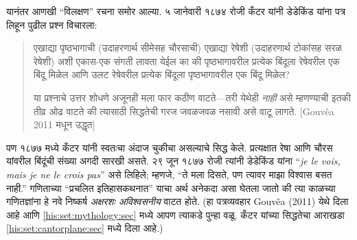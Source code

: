 यानंतर आणखी “विलक्षण” रचना समोर आल्या. ५ जानेवारी १८७४ रोजी कँटर यांनी डेडेकिंड यांना पत्र लिहून पुढील प्रश्न विचारला:
\begin{quote}
एखाद्या पृष्ठभागाची (उदाहरणार्थ सीमेसह चौरसाची) एखाद्या रेषेशी (उदाहरणार्थ टोकांसह सरळ रेषेशी) अशी एकास-एक संगती लावता येईल का की पृष्ठभागावरील प्रत्येक बिंदूला रेषेवरील एक बिंदू मिळेल आणि उलट रेषेवरील प्रत्येक बिंदूला पृष्ठभागावरील एक बिंदू मिळेल?

या प्रश्नाचे उत्तर शोधणे अजूनही मला फार कठीण वाटते—तरी येथेही \emph{नाही} असे म्हणण्याची इतकी तीव्र ओढ वाटते की त्यासाठी सिद्धतेची गरज जवळजवळ नसावी असे वाटू लागते.
[Gouv\^{e}a 2011 मधून उद्धृत]
\end{quote}
पण १८७७ मध्ये कँटर यांनी स्वतःचा अंदाज चुकीचा असल्याचे सिद्ध केले. प्रत्यक्षात रेषा आणि चौरस यांवरील बिंदूंची संख्या अगदी सारखी असते. २९ जून १८७७ रोजी त्यांनी डेडेकिंड यांना “\emph{je le vois, mais je ne le crois pas}” असे लिहिले; म्हणजे, “ते मला दिसते, पण त्यावर माझा विश्वास बसत नाही.” गणिताच्या “प्रचलित इतिहासकथनात” याचा अर्थ अनेकदा असा घेतला जातो की त्या काळच्या गणितज्ञांना हे नवे निष्कर्ष \emph{अक्षरशः अविश्वसनीय} वाटत होते. (हा पत्रव्यवहार Gouv\^{e}a (2011) येथे दिला आहे आणि \ref{his:set:mythology:sec} मध्ये आपण त्याकडे पुन्हा वळू. कँटर यांच्या सिद्धतेचा आराखडा \ref{his:set:cantorplane:sec} मध्ये दिला आहे.)

